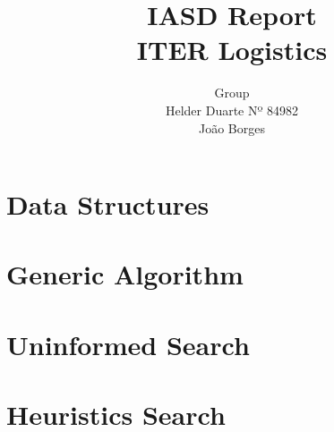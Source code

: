 \documentclass[]{report}
\title{IASD Report \\ ITER Logistics}
\author{Group  \\ Helder Duarte Nº 84982 \\ João Borges }
\begin{document}
\maketitle

\clearpage
{}


\chapter*{Data Structures}

\chapter{Generic Algorithm}

\chapter{Uninformed Search}

\chapter{Heuristics Search}
\end{document}
